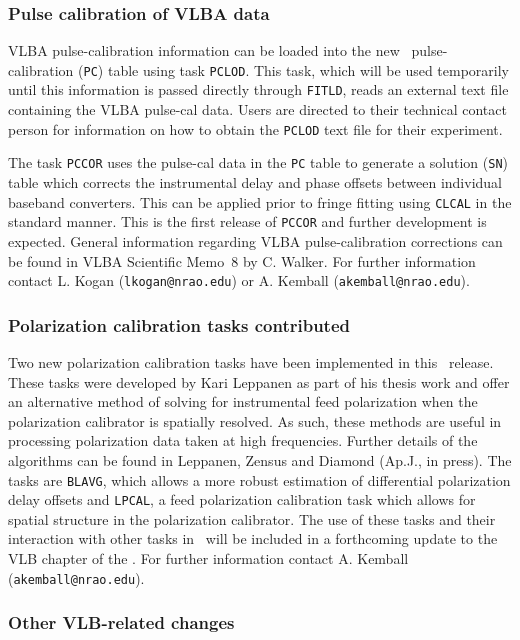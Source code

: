 \subsubsection{Pulse calibration of VLBA data}

VLBA pulse-calibration information can be loaded into the new \AIPS\
pulse-calibration ({\tt PC}) table using task \hbox{{\tt PCLOD}}. This
task, which will be used temporarily until this information is passed
directly through {\tt FITLD}, reads an external text file containing
the VLBA pulse-cal data.  Users are directed to their technical
contact person for information on how to obtain the {\tt PCLOD} text
file for their experiment.

The task {\tt PCCOR} uses the pulse-cal data in the {\tt PC} table to
generate a solution ({\tt SN}) table which corrects the instrumental
delay and phase offsets between individual baseband converters.  This
can be applied prior to fringe fitting using {\tt CLCAL} in the
standard manner. This is the first release of {\tt PCCOR} and further
development is expected.  General information regarding VLBA
pulse-calibration corrections can be found in VLBA Scientific Memo~8
by C. Walker.  For further information contact L. Kogan
({\tt lkogan@nrao.edu}) or A. Kemball ({\tt akemball@nrao.edu}).

\subsubsection{Polarization calibration tasks contributed}

Two new polarization calibration tasks have been implemented in this
\AIPS\ release. These tasks were developed by Kari Leppanen as part
of his thesis work and offer an alternative method of solving for
instrumental feed polarization when the polarization calibrator is
spatially resolved.  As such, these methods are useful in processing
polarization data taken at high frequencies.  Further details of the
algorithms can be found in Leppanen, Zensus and Diamond (Ap.J., in
press).  The tasks are {\tt BLAVG}, which allows a more robust
estimation of differential polarization delay offsets and {\tt LPCAL},
a feed polarization calibration task which allows for spatial
structure in the polarization calibrator.  The use of these tasks and
their interaction with other tasks in \AIPS\ will be included in a
forthcoming update to the VLB chapter of the \Cookbook.  For further
information contact A. Kemball ({\tt akemball@nrao.edu}).

\subsubsection{Other VLB-related changes}

